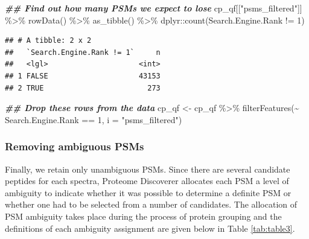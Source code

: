 \documentclass[9pt,a4paper,]{extarticle}
\newenvironment{Shaded}{\begin{snugshade}}{\end{snugshade}}
\newcommand{\AttributeTok}[1]{\textcolor[rgb]{0.77,0.63,0.00}{#1}}
\newcommand{\DecValTok}[1]{\textcolor[rgb]{0.00,0.00,0.81}{#1}}
\newcommand{\DocumentationTok}[1]{\textcolor[rgb]{0.56,0.35,0.01}{\textbf{\textit{#1}}}}
\newcommand{\FunctionTok}[1]{\textcolor[rgb]{0.00,0.00,0.00}{#1}}
\newcommand{\NormalTok}[1]{#1}
\newcommand{\OtherTok}[1]{\textcolor[rgb]{0.56,0.35,0.01}{#1}}
\newcommand{\SpecialCharTok}[1]{\textcolor[rgb]{0.00,0.00,0.00}{#1}}
\newcommand{\StringTok}[1]{\textcolor[rgb]{0.31,0.60,0.02}{#1}}
\begin{document}
\begin{Shaded}
\begin{Highlighting}[]
\DocumentationTok{\#\# Find out how many PSMs we expect to lose}
\NormalTok{cp\_qf[[}\StringTok{"psms\_filtered"}\NormalTok{]] }\SpecialCharTok{\%\textgreater{}\%} 
  \FunctionTok{rowData}\NormalTok{() }\SpecialCharTok{\%\textgreater{}\%} 
  \FunctionTok{as\_tibble}\NormalTok{() }\SpecialCharTok{\%\textgreater{}\%} 
\NormalTok{  dplyr}\SpecialCharTok{::}\FunctionTok{count}\NormalTok{(Search.Engine.Rank }\SpecialCharTok{!=} \DecValTok{1}\NormalTok{)}
\end{Highlighting}
\end{Shaded}

\begin{verbatim}
## # A tibble: 2 x 2
##   `Search.Engine.Rank != 1`     n
##   <lgl>                     <int>
## 1 FALSE                     43153
## 2 TRUE                        273
\end{verbatim}

\begin{Shaded}
\begin{Highlighting}[]
\DocumentationTok{\#\# Drop these rows from the data}
\NormalTok{cp\_qf }\OtherTok{\textless{}{-}}\NormalTok{ cp\_qf }\SpecialCharTok{\%\textgreater{}\%}
  \FunctionTok{filterFeatures}\NormalTok{(}\SpecialCharTok{\textasciitilde{}}\NormalTok{ Search.Engine.Rank }\SpecialCharTok{==} \DecValTok{1}\NormalTok{,}
                 \AttributeTok{i =} \StringTok{"psms\_filtered"}\NormalTok{)}
\end{Highlighting}
\end{Shaded}

\hypertarget{removing-ambiguous-psms}{%
\subsubsection{Removing ambiguous PSMs}\label{removing-ambiguous-psms}}

Finally, we retain only unambiguous PSMs. Since there are several candidate
peptides for each spectra, Proteome Discoverer allocates each PSM a level of
ambiguity to indicate whether it was possible to determine a definite PSM or
whether one had to be selected from a number of candidates. The allocation of
PSM ambiguity takes place during the process of protein grouping and the
definitions of each ambiguity assignment are given below in Table
\ref{tab:table3}.
\end{document}

